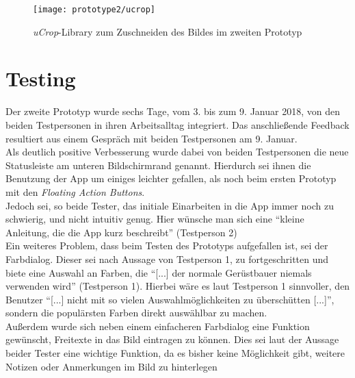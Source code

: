 \begin{figure}[h]
  \centering
  \texttt{[image: prototype2/ucrop]}
  \caption{\emph{uCrop}-Library zum Zuschneiden des Bildes im zweiten Prototyp}
  \label{fig:ucrop}
\end{figure}


\section{Testing}\label{sec:test2}
Der zweite Prototyp wurde sechs Tage, vom 3. bis zum 9. Januar 2018, von den beiden Testpersonen in ihren Arbeitsalltag integriert.
Das anschließende Feedback resultiert aus einem Gespräch mit beiden Testpersonen am 9. Januar. \\

Als deutlich positive Verbesserung wurde dabei von beiden Testpersonen die neue Statusleiste am unteren Bildschirmrand genannt.
Hierdurch sei ihnen die Benutzung der App um einiges leichter gefallen, als noch beim ersten Prototyp mit den \emph{Floating Action Buttons}. \\

Jedoch sei, so beide Tester, das initiale Einarbeiten in die App immer noch zu schwierig, und nicht intuitiv genug.
Hier wünsche man sich eine ``kleine Anleitung, die die App kurz beschreibt'' (Testperson 2) \\

Ein weiteres Problem, dass beim Testen des Prototyps aufgefallen ist, sei der Farbdialog.
Dieser sei nach Aussage von Testperson 1, zu fortgeschritten und biete eine Auswahl an Farben, die ``[...] der normale Gerüstbauer niemals verwenden wird'' (Testperson 1).
Hierbei wäre es laut Testperson 1 sinnvoller, den Benutzer ``[...] nicht mit so vielen Auswahlmöglichkeiten zu überschütten [...]'', sondern die populärsten Farben direkt auswählbar zu machen. \\

Außerdem wurde sich neben einem einfacheren Farbdialog eine Funktion gewünscht, Freitexte in das Bild eintragen zu können. 
Dies sei laut der Aussage beider Tester eine wichtige Funktion, da es bisher keine Möglichkeit gibt, weitere Notizen oder Anmerkungen im Bild zu hinterlegen \\

